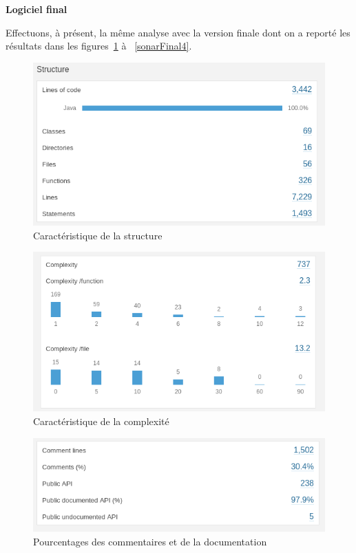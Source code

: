 \documentclass[12pt, openany]{report}
\begin{document}
\newpage
\textbf{Logiciel final}

Effectuons, à présent, la même analyse avec la version finale dont on a reporté les résultats dans les figures~\ref{sonarFinal1} à ~\ref{sonarFinal4}.


\begin{figure}[!h]
	\centering
	\includegraphics[scale=0.5]{Images/sonarFinal1.png} 
	\caption{Caractéristique de la structure}
	\label{sonarFinal1}
\end{figure} 

\begin{figure}[!h]
	\centering
	\includegraphics[scale=0.5]{Images/sonarFinale2.png} 
	\caption{Caractéristique de la complexité}
	\label{sonarFinal2}
\end{figure} 

\begin{figure}[!h]
	\centering
	\includegraphics[scale=0.5]{Images/sonarFinale3.png} 
	\caption{Pourcentages des commentaires et de la documentation}
	\label{sonarFinal3}
\end{figure} 
\end{document}
